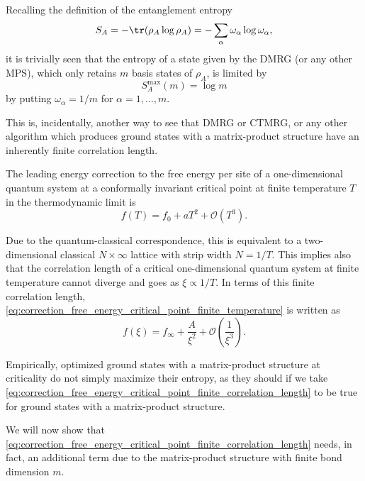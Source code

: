 Recalling the definition of the entanglement entropy
\begin{equation}
  S_A = - \tr(\rho_A \log \rho_A) = - \sum_{\alpha} \omega_{\alpha} \log \omega_{\alpha},
\end{equation}
it is trivially seen that the entropy of a state given by the DMRG (or any other MPS), which only
retains $m$ basis states of $\rho_A$, is limited by
\begin{equation}
  S^{\text{max}}_A(m) = \log m
\end{equation}
by putting $\omega_{\alpha} = 1/m$ for $\alpha = 1, \dots, m$.

This is, incidentally, another way to see that DMRG or CTMRG, or any other algorithm which produces ground states with a
matrix-product structure have an inherently finite correlation length.

The leading energy correction to the free energy per site of a one-dimensional quantum system at a conformally invariant
critical point at finite temperature $T$ in the thermodynamic limit is \cite{affleck1986universal}
\begin{equation}\label{eq:correction_free_energy_critical_point_finite_temperature}
  f(T) = f_0 + aT^2 + \mathcal{O}(T^3).
\end{equation}

Due to the quantum-classical correspondence, this is equivalent to a two-dimensional classical $N \times \infty$ lattice
with strip width $N = 1/T$.
This implies also that the correlation length of a critical one-dimensional quantum system at finite temperature cannot
diverge and goes as $\xi \propto 1/T$.
In terms of this finite correlation length, \autoref{eq:correction_free_energy_critical_point_finite_temperature} is
written as
\begin{equation}\label{eq:correction_free_energy_critical_point_finite_correlation_length}
  f(\xi) = f_{\infty} + \frac{A}{\xi^2} + \mathcal{O(\frac{1}{\xi^3})}.
\end{equation}

Empirically, optimized ground states with a matrix-product structure at criticality do not simply maximize their
entropy, as they should if we take \autoref{eq:correction_free_energy_critical_point_finite_correlation_length} to be
true for ground states with a matrix-product structure.

We will now show that \autoref{eq:correction_free_energy_critical_point_finite_correlation_length} needs,
in fact, an additional term due to the matrix-product structure with finite bond dimension $m$.

